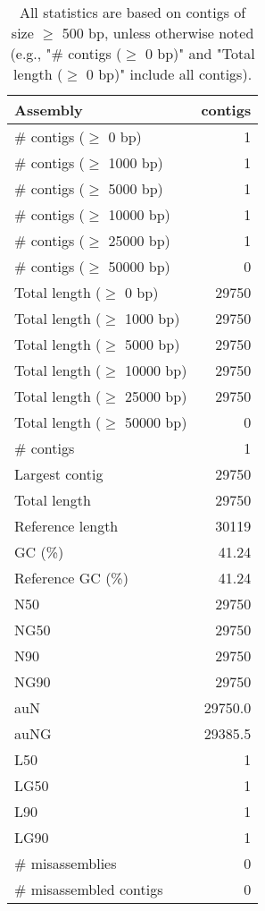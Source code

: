 \documentclass[12pt,a4paper]{article}
\begin{document}
\begin{table}[ht]
\begin{center}
\caption{All statistics are based on contigs of size $\geq$ 500 bp, unless otherwise noted (e.g., "\# contigs ($\geq$ 0 bp)" and "Total length ($\geq$ 0 bp)" include all contigs).}
\begin{tabular}{|l*{1}{|r}|}
\hline
Assembly & contigs \\ \hline
\# contigs ($\geq$ 0 bp) & 1 \\ \hline
\# contigs ($\geq$ 1000 bp) & 1 \\ \hline
\# contigs ($\geq$ 5000 bp) & 1 \\ \hline
\# contigs ($\geq$ 10000 bp) & 1 \\ \hline
\# contigs ($\geq$ 25000 bp) & 1 \\ \hline
\# contigs ($\geq$ 50000 bp) & 0 \\ \hline
Total length ($\geq$ 0 bp) & 29750 \\ \hline
Total length ($\geq$ 1000 bp) & 29750 \\ \hline
Total length ($\geq$ 5000 bp) & 29750 \\ \hline
Total length ($\geq$ 10000 bp) & 29750 \\ \hline
Total length ($\geq$ 25000 bp) & 29750 \\ \hline
Total length ($\geq$ 50000 bp) & 0 \\ \hline
\# contigs & 1 \\ \hline
Largest contig & 29750 \\ \hline
Total length & 29750 \\ \hline
Reference length & 30119 \\ \hline
GC (\%) & 41.24 \\ \hline
Reference GC (\%) & 41.24 \\ \hline
N50 & 29750 \\ \hline
NG50 & 29750 \\ \hline
N90 & 29750 \\ \hline
NG90 & 29750 \\ \hline
auN & 29750.0 \\ \hline
auNG & 29385.5 \\ \hline
L50 & 1 \\ \hline
LG50 & 1 \\ \hline
L90 & 1 \\ \hline
LG90 & 1 \\ \hline
\# misassemblies & 0 \\ \hline
\# misassembled contigs & 0 \\ \hline

\end{tabular}
\end{center}
\end{table}
\end{document}
